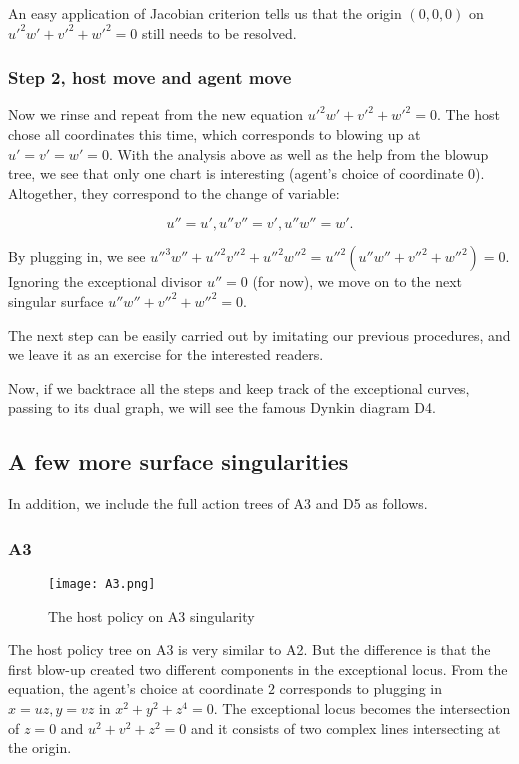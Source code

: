 \documentclass{article}
\theoremstyle{plain}
\theoremstyle{definition}
\theoremstyle{remark}
\begin{document}
An easy application of Jacobian criterion tells us that the origin $(0,0,0)$ on $u'^2w'+v'^2+w'^2=0$ still needs to be resolved.

\subsubsection{Step 2, host move and agent move}
Now we rinse and repeat from the new equation $u'^2w'+v'^2+w'^2=0$. The host chose all coordinates this time, which corresponds to blowing up at $u'=v'=w'=0$. With the analysis above as well as the help from the blowup tree, we see that only one chart is interesting (agent's choice of coordinate $0$). Altogether, they correspond to the change of variable:

$$u''=u', u''v''=v', u''w''=w'.$$

By plugging in, we see $u''^3w''+u''^2v''^2+u''^2w''^2=u''^2(u''w''+v''^2+w''^2)=0$. Ignoring the exceptional divisor $u''=0$ (for now), we move on to the next singular surface $u''w''+v''^2+w''^2=0$.

The next step can be easily carried out by imitating our previous procedures, and we leave it as an exercise for the interested readers.

Now, if we backtrace all the steps and keep track of the exceptional curves, passing to its dual graph, we will see the famous Dynkin diagram D4.



\subsection{A few more surface singularities}
In addition, we include the full action trees of A3 and D5 as follows. 

\subsubsection{A3}

\begin{figure}[ht!]
\centering
\texttt{[image: A3.png]}
\caption{The host policy on A3 singularity} \label{a3}
\end{figure}

The host policy tree on A3 is very similar to A2. But the difference is that the first blow-up created two different components in the exceptional locus. From the equation, the agent's choice at coordinate $2$ corresponds to plugging in $x=uz, y=vz$ in $x^2+y^2+z^4=0$. The exceptional locus becomes the intersection of $z=0$ and $u^2+v^2+z^2=0$ and it consists of two complex lines intersecting at the origin.
\end{document}
